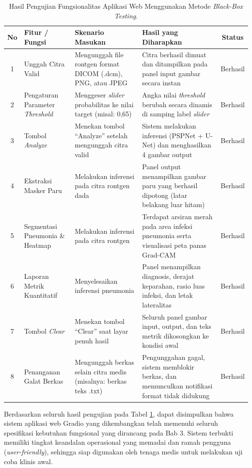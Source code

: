 \documentclass[12pt,a4paper,oneside]{book}
\begin{document}
\begin{table}[H]
  \centering
  \caption{Hasil Pengujian Fungsionalitas Aplikasi Web Menggunakan Metode \textit{Black-Box Testing}.}
  \label{tab:blackbox_testing}
  \begin{tabularx}{\textwidth}{|c|p{3.5cm}|X|X|c|}
    \hline
    \textbf{No} & \textbf{Fitur / Fungsi} & \textbf{Skenario Masukan} & \textbf{Hasil yang Diharapkan} & \textbf{Status} \\
    \hline
    1 & Unggah Citra Valid & Mengunggah file rontgen format DICOM (.dcm), PNG, atau JPEG & Citra berhasil dimuat dan ditampilkan pada panel input gambar secara instan & Berhasil \\
    \hline
    2 & Pengaturan Parameter \textit{Threshold} & Menggeser \textit{slider} probabilitas ke nilai target (misal: 0,65) & Angka nilai \textit{threshold} berubah secara dinamis di samping label \textit{slider} & Berhasil \\
    \hline
    3 & Tombol \textit{Analyze} & Menekan tombol ``Analyze'' setelah mengunggah citra valid & Sistem melakukan inferensi (PSPNet + U-Net) dan menghasilkan 4 gambar output & Berhasil \\
    \hline
    4 & Ekstraksi Masker Paru & Melakukan inferensi pada citra rontgen dada & Panel output menampilkan gambar paru yang berhasil dipotong (latar belakang luar hitam) & Berhasil \\
    \hline
    5 & Segmentasi Pneumonia \& Heatmap & Melakukan inferensi pada citra rontgen & Terdapat arsiran merah pada area infeksi pneumonia serta visualisasi peta panas Grad-CAM & Berhasil \\
    \hline
    6 & Laporan Metrik Kuantitatif & Menyelesaikan inferensi pneumonia & Panel menampilkan diagnosis, derajat keparahan, rasio luas infeksi, dan letak lateralitas & Berhasil \\
    \hline
    7 & Tombol \textit{Clear} & Menekan tombol ``Clear'' saat layar penuh hasil & Seluruh panel gambar input, output, dan teks metrik dikosongkan ke kondisi awal & Berhasil \\
    \hline
    8 & Penanganan Galat Berkas & Mengunggah berkas selain citra medis (misalnya: berkas teks .txt) & Pengunggahan gagal, sistem memblokir berkas, dan memunculkan notifikasi format tidak didukung & Berhasil \\
    \hline
  \end{tabularx}
\end{table}

Berdasarkan seluruh hasil pengujian pada Tabel \ref{tab:blackbox_testing}, dapat disimpulkan bahwa sistem aplikasi web Gradio yang dikembangkan telah memenuhi seluruh spesifikasi kebutuhan fungsional yang dirancang pada Bab 3. Sistem terbukti memiliki tingkat keandalan operasional yang memadai dan ramah pengguna (\textit{user-friendly}), sehingga siap digunakan oleh tenaga medis untuk melakukan uji coba klinis awal.
\end{document}
